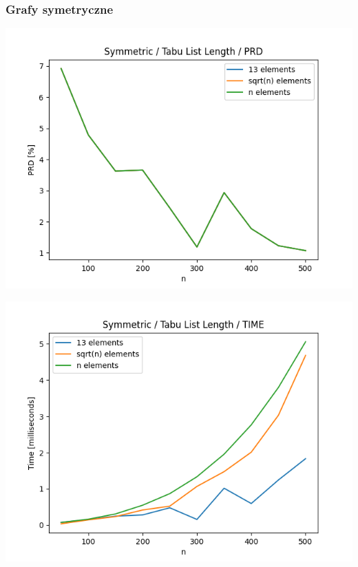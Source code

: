\documentclass{article}
\begin{document}
\subsubsection{Grafy symetryczne}

\begin{center}
\includegraphics[width=\textwidth, 
                   height = 0.4\textheight, 
                   keepaspectratio]
                  {plots/tabu_symmetric_prd} 
\end{center}

\begin{center}
\includegraphics[width=\textwidth, 
                   height = 0.4\textheight, 
                   keepaspectratio]
                  {plots/tabu_symmetric_time} 
\end{center}
\end{document}

